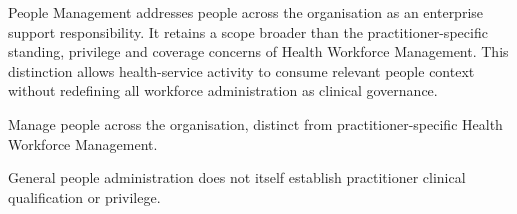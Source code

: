 People Management addresses people across the organisation as an enterprise support responsibility. It retains a scope broader than the practitioner-specific standing, privilege and coverage concerns of Health Workforce Management. This distinction allows health-service activity to consume relevant people context without redefining all workforce administration as clinical governance.



Manage people across the organisation, distinct from practitioner-specific Health Workforce Management.



General people administration does not itself establish practitioner clinical qualification or privilege.


